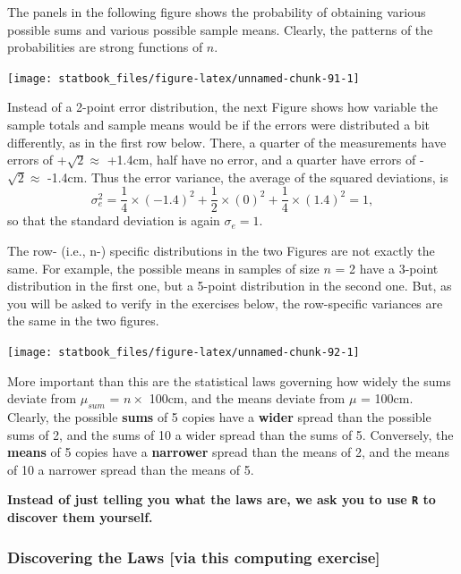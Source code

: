 \documentclass[]{book}
\begin{document}
The panels in the following figure shows the probability of obtaining various possible sums and various possible sample means. Clearly, the patterns of the probabilities are strong functions of \(n.\)

\begin{center}\texttt{[image: statbook\_files/figure-latex/unnamed-chunk-91-1]} \end{center}

Instead of a 2-point error distribution, the next Figure shows how variable the sample totals and sample means would be if the errors were distributed a bit differently, as in the first row below. There, a quarter of the measurements have errors of +\(\sqrt{2} \approx\) +1.4cm, half have no error, and a quarter have errors of -\(\sqrt{2} \approx\) -1.4cm. Thus the error variance, the average of the squared deviations, is
\[\sigma_e^2 = \frac{1}{4} \times (-1.4)^2  +  \frac{1}{2} \times (0)^2 +  \frac{1}{4} \times (1.4)^2 = 1,\] so that the standard deviation is again \(\sigma_e = 1.\)

The row- (i.e., n-) specific distributions in the two Figures are not exactly the same. For example, the possible means in samples of size \(n\) = 2 have a 3-point distribution in the first one, but a 5-point distribution in the second one. But, as you will be asked to verify in the exercises below, the row-specific variances are the same in the two figures.

\begin{center}\texttt{[image: statbook\_files/figure-latex/unnamed-chunk-92-1]} \end{center}

More important than this are the statistical laws governing how widely the sums deviate from \(\mu_{sum}\) = \(n \times\) 100cm, and the means deviate from \(\mu\) = 100cm. Clearly, the possible \textbf{sums} of 5 copies have a \textbf{wider} spread than the possible sums of 2, and the sums of 10 a wider spread than the sums of 5. Conversely, the \textbf{means} of 5 copies have a \textbf{narrower} spread than the means of 2, and the means of 10 a narrower spread than the means of 5.

\textbf{Instead of just telling you what the laws are, we ask you to use \texttt{R} to discover them yourself.}

\hypertarget{discovering-the-laws-via-this-computing-exercise}{%
\subsubsection{Discovering the Laws {[}via this computing exercise{]}}\label{discovering-the-laws-via-this-computing-exercise}}
\end{document}
